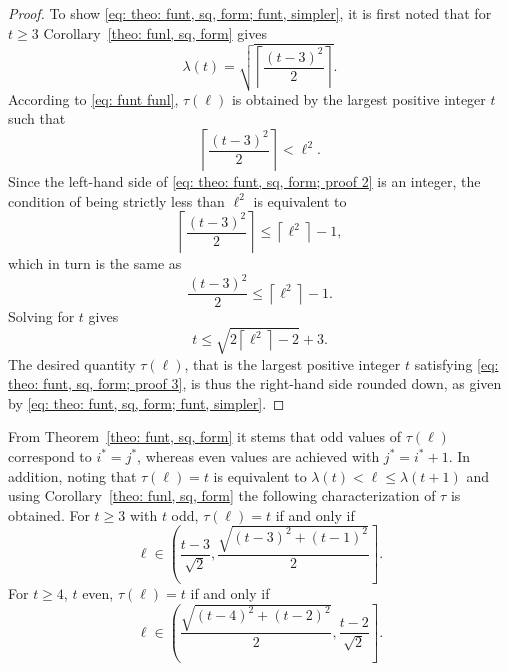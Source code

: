 \documentclass[12pt, a4paper]{article}
\newcommand{\funt}{\tau} %
\newcommand{\funl}{\lambda} %
\newcommand{\len}{\ell} %
\newcommand{\tiles}{t} %
\newcommand{\isoli}{i^\ast}
\newcommand{\jsoli}{j^\ast}
\begin{document}
\begin{proof}
To show \eqref{eq: theo: funt, sq, form; funt, simpler}, it is first noted that for $\tiles \geq 3$ Corollary~\ref{theo: funl, sq, form} gives
\begin{equation}
\funl(\tiles) = \sqrt{\left\lceil \frac{(\tiles-3)^2} {2} \right\rceil}.
\end{equation}
According to \eqref{eq: funt funl}, $\funt(\len)$ is obtained by the largest positive integer $\tiles$ such that 
\begin{equation}
\label{eq: theo: funt, sq, form; proof 2}
\left\lceil \frac{(\tiles-3)^2} {2} \right\rceil < \len ^ 2.
\end{equation}
Since the left-hand side of \eqref{eq: theo: funt, sq, form; proof 2} is an integer, the condition of being strictly less than $\len^2$ is equivalent to
\begin{equation}
\left\lceil \frac{(\tiles-3)^2} {2} \right\rceil  \leq \left\lceil \len^2 \right\rceil  - 1,
\end{equation}
which in turn is the same as
\begin{equation}
\frac{(\tiles-3)^2} {2}\leq  \left\lceil \len^2 \right\rceil  - 1. 
\end{equation}
Solving for $\tiles$ gives
\begin{equation}
\label{eq: theo: funt, sq, form; proof 3}
\tiles \leq \sqrt{2 \left\lceil \len^2 \right\rceil -2 } + 3.
\end{equation}
The desired quantity $\funt(\len)$, that is the largest positive integer $\tiles$ satisfying \eqref{eq: theo: funt, sq, form; proof 3}, is thus the right-hand side rounded down, as given by \eqref{eq: theo: funt, sq, form; funt, simpler}.
\end{proof}

From Theorem~\ref{theo: funt, sq, form} it stems that odd values of $\funt(\len)$ correspond to $\isoli = \jsoli$, whereas even values are achieved with $\jsoli = \isoli+1$. In addition, noting that $\funt(\len) = \tiles$ is equivalent to $\funl(\tiles) < \len \leq \funl(\tiles+1)$ and using Corollary~\ref{theo: funl, sq, form} the following characterization of $\funt$ is obtained. For $\tiles \geq 3$ with $\tiles$ odd, $\funt(\len) = \tiles$ if and only if
\begin{equation}
\label{eq: square, odd max tiles, lengths}
\len \in \left( \frac{\tiles-3}{\sqrt{2}}, \frac{ \sqrt{(\tiles-3)^2+(\tiles-1)^2}}{2} \right].
\end{equation}
For $\tiles \geq 4$, $\tiles$ even, $\funt(\len) = \tiles$ if and only if
\begin{equation}
\label{eq: square, even max tiles, lengths}
\len \in \left(\frac{ \sqrt{(\tiles-4)^2+(\tiles-2)^2}}{2}, \frac{\tiles-2}{\sqrt{2}} \right].
\end{equation}
\end{document}
